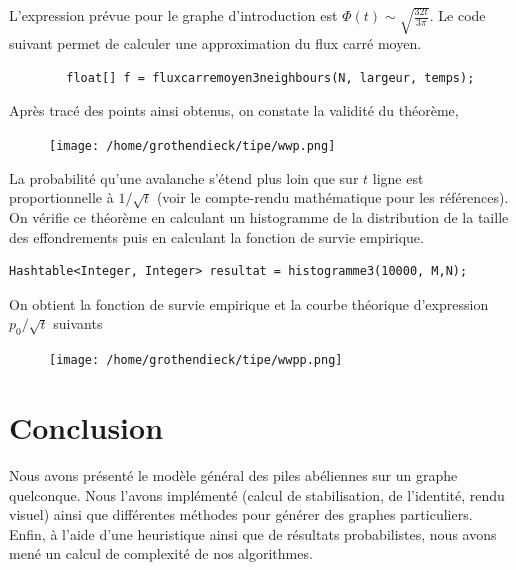 \documentclass{article}
\begin{document}
L'expression prévue pour le graphe d'introduction est $\Phi(t) \sim \sqrt{\frac{32 t}{3\pi}}$. Le code suivant permet de calculer une approximation du flux carré moyen.  
\begin{lstlisting}
        float[] f = fluxcarremoyen3neighbours(N, largeur, temps);
\end{lstlisting}

Après tracé des points ainsi obtenus, on constate la validité du théorème, 
\begin{figure}[h]
	\centering
	\texttt{[image: /home/grothendieck/tipe/wwp.png]}
\end{figure}

La probabilité qu'une avalanche s'étend plus loin que sur $t$ ligne est proportionnelle à $1/\sqrt{t}$ (voir le compte-rendu mathématique pour les références). On vérifie ce théorème en calculant un histogramme de la distribution de la taille des effondrements puis en calculant la fonction de survie empirique.
\begin{lstlisting}
Hashtable<Integer, Integer> resultat = histogramme3(10000, M,N);
\end{lstlisting}

On obtient la fonction de survie empirique et la courbe théorique d'expression $p_0/\sqrt{t}$ suivants
\begin{figure}[h]
	\centering
	\texttt{[image: /home/grothendieck/tipe/wwpp.png]}
\end{figure}
\section{Conclusion}
Nous avons présenté le modèle général des piles abéliennes sur un graphe quelconque. Nous l'avons implémenté (calcul de stabilisation, de l'identité, rendu visuel) ainsi que différentes méthodes pour générer des graphes particuliers. Enfin, à l'aide d'une heuristique ainsi que de résultats probabilistes, nous avons mené un calcul de complexité de nos algorithmes.
\end{document}
